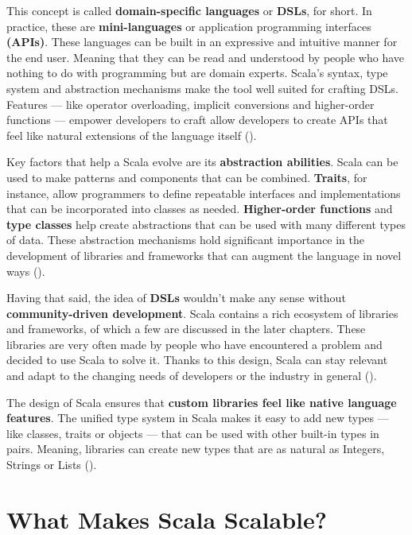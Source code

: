 This concept is called \textbf{domain-specific languages} or \textbf{DSLs}, for short. In practice, these are \textbf{mini-languages} or application programming interfaces \textbf{(APIs)}. These languages can be built in an expressive and intuitive manner for the end user. Meaning that they can be read and understood by people who have nothing to do with programming but are domain experts. Scala's syntax, type system and abstraction mechanisms make the tool well suited for crafting DSLs. Features — like operator overloading, implicit conversions and higher-order functions — empower developers to craft allow developers to create APIs that feel like natural extensions of the language itself (\cite{odersky.etal_2021})\footnotemark[2].

Key factors that help a Scala evolve are its \textbf{abstraction abilities}. Scala can be used to make patterns and components that can be combined. \textbf{Traits}, for instance, allow programmers to define repeatable interfaces and implementations that can be incorporated into classes as needed. \textbf{Higher-order functions} and \textbf{type classes} help create abstractions that can be used with many different types of data. These abstraction mechanisms hold significant importance in the development of libraries and frameworks that can augment the language in novel ways (\cite{odersky.etal_2021})\footnotemark[2].

Having that said, the idea of \textbf{DSLs} wouldn't make any sense without \textbf{community-driven development}. Scala contains a rich ecosystem of libraries and frameworks, of which a few are discussed in the later chapters. These libraries are very often made by people who have encountered a problem and decided to use Scala to solve it. Thanks to this design, Scala can stay relevant and adapt to the changing needs of developers or the industry in general (\cite{odersky.etal_2021})\footnotemark[2].

The design of Scala ensures that \textbf{custom libraries feel like native language features}. The unified type system in Scala makes it easy to add new types — like classes, traits or objects — that can be used with other built-in types in pairs. Meaning, libraries can create new types that are as natural as Integers, Strings or Lists (\cite{ghoshDSLsAction2011})\footnotemark[3].

\section{What Makes Scala Scalable?}

